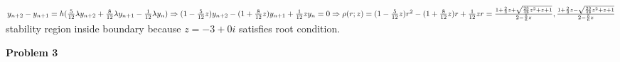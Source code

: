\documentclass[10pt]{article}
\begin{document}
\begin{enumerate}[label=(\alph*)]
\begin{figure}[H]
    \end{figure}
    $y_{n+2}-y_{n+1}=h(\frac{5}{12}\lambda y_{n+2}+\frac{8}{12}\lambda y_{n+1}-\frac{1}{12}\lambda y_n)\\
    \Rightarrow (1-\frac{5}{12}z)y_{n+2}-(1+\frac{8}{12}z)y_{n+1}+\frac{1}{12}z y_n=0\\
    \Rightarrow \rho(r;z)=(1-\frac{5}{12}z)r^2-(1+\frac{8}{12}z)r+\frac{1}{12}z\\
    r=\frac{1+\frac{2}{3}z+\sqrt{\frac{23}{48}z^2+z+1}}{2-\frac{5}{6}z},\frac{1+\frac{2}{3}z-\sqrt{\frac{23}{48}z^2+z+1}}{2-\frac{5}{6}z}$\\
    stability region inside boundary because $z=-3+0i$ satisfies root condition.\\
\end{enumerate}
\textbf{Problem 3}
\end{document}
